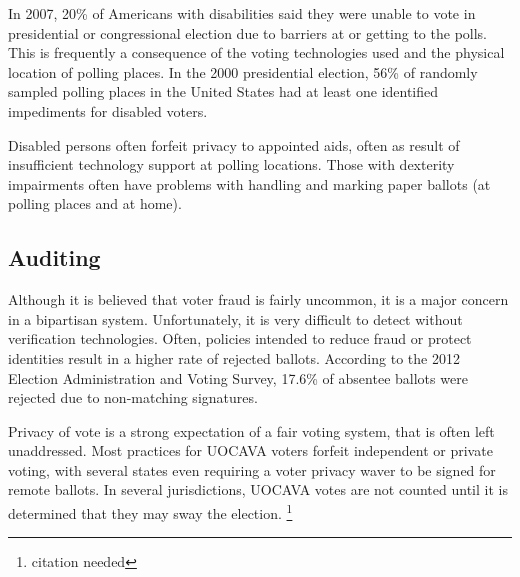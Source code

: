In 2007, 20\% of Americans with disabilities said they were unable to vote in
presidential or congressional election due to barriers at or getting to the
polls. This is frequently a consequence of the voting technologies used and the
physical location of polling places. In the 2000 presidential election, 56\% of
randomly sampled polling places in the United States had at least one identified
impediments for disabled voters.

Disabled persons often forfeit privacy to appointed aids,%
often as result of insufficient technology support at polling locations.
Those with dexterity impairments often have problems with handling and marking
paper ballots (at polling places and at
home).


\subsection{Auditing}
Although it is believed that voter fraud is fairly uncommon, it is a major
concern in a bipartisan system. Unfortunately, it is very difficult to detect
without verification technologies. Often, policies intended to reduce fraud
or protect identities result in a higher rate of rejected ballots. According
to the 2012 Election Administration and Voting Survey, 17.6\% of absentee
ballots were rejected due to non-matching signatures.

Privacy of vote is a strong expectation of a fair voting system, that is often
left unaddressed. Most practices for UOCAVA voters forfeit independent or
private voting, with several states even requiring a voter privacy waver to be
signed for remote ballots. In several jurisdictions, UOCAVA votes are not
counted until it is determined that they may sway the election.
\footnote{citation needed}


